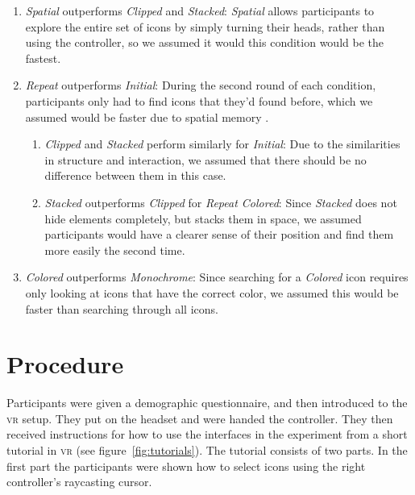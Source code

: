 \documentclass[nobib]{tufte-book} %
\begin{document}
\begin{enumerate}[label=H\arabic*. , wide=0.5em,  leftmargin=*]
  \item \emph{Spatial} outperforms \emph{Clipped} and \emph{Stacked}: \emph{Spatial} allows participants to explore the entire set of icons by simply turning their heads, rather than using the controller, so we assumed it would this condition would be the fastest.
  \item \emph{Repeat} outperforms \emph{Initial}: During the second round of each condition, participants only had to find icons that they'd found before, which we assumed would be faster due to spatial memory \cite{scarr2013supporting}.
  \begin{enumerate}[label=H2.\arabic*. , wide=0.5em,  leftmargin=*]
    \item \emph{Clipped} and \emph{Stacked} perform similarly for \emph{Initial}: Due to the similarities in structure and interaction, we assumed that there should be no difference between them in this case.
    \item \emph{Stacked} outperforms \emph{Clipped} for \emph{Repeat Colored}: Since \emph{Stacked} does not hide elements completely, but stacks them in space, we assumed participants would have a clearer sense of their position and find them more easily the second time.
  \end{enumerate}
  \item \emph{Colored} outperforms \emph{Monochrome}: Since searching for a \emph{Colored} icon requires only looking at icons that have the correct color, we assumed this would be faster than searching through all icons.
\end{enumerate}

\section{Procedure}
Participants were given a demographic questionnaire, and then introduced to the \textsc{vr} setup. They put on the headset and were handed the controller. They then received instructions for how to use the interfaces in the experiment from a short tutorial in \textsc{vr} (see figure~\ref{fig:tutorials}). The tutorial consists of two parts.
In the first part the participants were shown how to select icons using the right controller's raycasting cursor.
\end{document}
